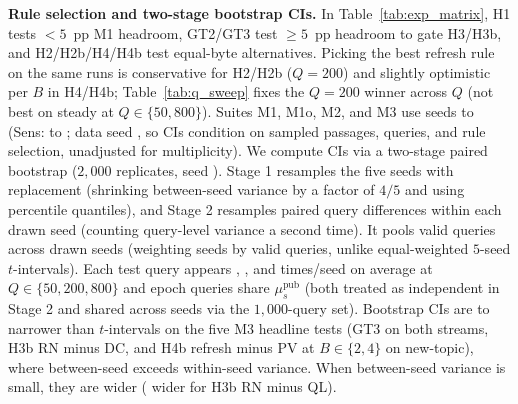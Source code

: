 \textbf{Rule selection and two-stage bootstrap CIs.} In Table~\ref{tab:exp_matrix}, H1 tests $< 5$~pp M1 headroom, GT2/GT3 test $\ge 5$~pp headroom to gate H3/H3b, and H2/H2b/H4/H4b test equal-byte alternatives. Picking the best refresh rule on the same runs is conservative for H2/H2b ($Q{=}200$) and slightly optimistic per $B$ in H4/H4b; Table~\ref{tab:q_sweep} fixes the $Q{=}200$ winner across $Q$ (not best on steady at $Q \in \{50, 800\}$). Suites M1, M1o, M2, and M3 use seeds \RNumSeedMin{} to \RNumSeedMax{} (Sens: \RNumSeedMin{} to \RNumSensSeedMax{}; data seed \RNumDataSeed{}, so CIs condition on sampled passages, queries, and rule selection, unadjusted for multiplicity). We compute \RNumCIPct{} CIs via a two-stage paired bootstrap ($2{,}000$ replicates, seed \RNumBootSeed{}). Stage 1 resamples the five seeds with replacement (shrinking between-seed variance by a factor of $4/5$ and using percentile quantiles), and Stage 2 resamples paired query differences within each drawn seed (counting query-level variance a second time). It pools valid queries across drawn seeds (weighting seeds by valid queries, unlike equal-weighted $5$-seed $t$-intervals). Each test query appears \RNumQueryRepeatsQFifty{}, \RNumQueryRepeatsQTwoHundred{}, and \RNumQueryRepeatsQEightHundred{} times/seed on average at $Q \in \{50, 200, 800\}$ and epoch queries share $\mu_s^{\text{pub}}$ (both treated as independent in Stage 2 and shared across seeds via the $1{,}000$-query set). Bootstrap CIs are \RNumBootNarrowerMin{} to \RNumBootNarrowerMax{} narrower than $t$-intervals on the five M3 headline tests (GT3 on both streams, H3b RN minus DC, and H4b refresh minus PV at $B \in \{2, 4\}$ on new-topic), where between-seed exceeds within-seed variance. When between-seed variance is small, they are wider (\RNumBootWiderMThreeRNMinusQLNewTopic{} wider for H3b RN minus QL).
